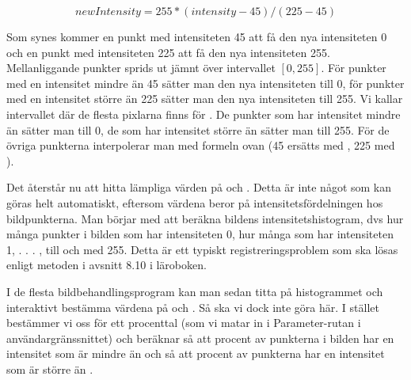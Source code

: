 $$newIntensity = 255 * (intensity - 45) / (225 - 45)$$

Som synes kommer en punkt med intensiteten 45 att få den nya intensiteten 0 och en punkt med intensiteten 225 att få den nya intensiteten 255. Mellanliggande punkter sprids ut jämnt över intervallet $[0, 255]$. För punkter med en intensitet mindre än 45 sätter man den nya intensiteten till 0, för punkter med en intensitet större än 225 sätter man den nya intensiteten till 255. Vi kallar intervallet där de flesta pixlarna finns för . De punkter som har intensitet mindre än  sätter man till 0, de som har intensitet större än  sätter man till 255. För de övriga punkterna interpolerar man med formeln ovan (45 ersätts med , 225 med ).

Det återstår nu att hitta lämpliga värden på  och . Detta är inte något som kan göras helt automatiskt, eftersom värdena beror på intensitetsfördelningen hos bildpunkterna. Man börjar med att beräkna bildens intensitetshistogram, dvs hur många punkter i bilden som har intensiteten 0, hur många som har intensiteten 1, . . . , till och med 255. Detta är ett typiskt registreringsproblem som ska lösas enligt metoden i avsnitt 8.10 i läroboken. %

I de flesta bildbehandlingsprogram kan man sedan titta på histogrammet och interaktivt bestämma värdena på  och . Så ska vi dock inte göra här. I stället bestämmer vi oss för ett procenttal  (som vi matar in i Parameter-rutan i användargränssnittet) och beräknar  så att  procent av punkterna i bilden har en intensitet som är mindre än  och  så att  procent av punkterna har en intensitet som är större än .

